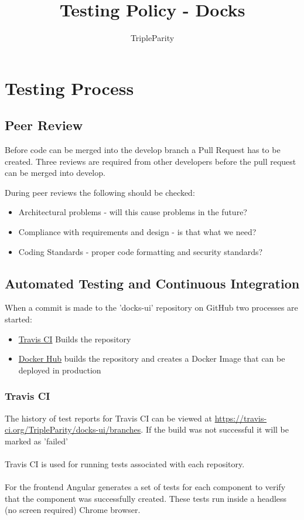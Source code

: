\documentclass[]{article}
\title{Testing Policy - Docks}
\author{TripleParity}
\date{}
\begin{document}
\maketitle

\tableofcontents

\section{Testing Process}

\subsection{Peer Review}
Before code can be merged into the develop branch a Pull Request has to be created.
Three reviews are required from other developers before the pull request
can be merged into develop.

During peer reviews the following should be checked:
\begin{itemize}
	\item Architectural problems - will this cause problems in the future?
	\item Compliance with requirements and design - is that what we need?
	\item Coding Standards - proper code formatting and security standards?
\end{itemize}

\subsection{Automated Testing and Continuous Integration}
When a commit is made to the 'docks-ui' repository on GitHub two
processes are started:
\begin{itemize}
	\item \href{https://travis-ci.org/TripleParity/docks-ui/branches}{Travis CI} Builds the repository
	\item \href{https://hub.docker.com/r/tripleparity/docks-ui/builds/}{Docker Hub} builds the repository and creates a Docker Image that can be deployed in production
\end{itemize}

\subsubsection{Travis CI}
The history of test reports for Travis CI can be viewed at \url{https://travis-ci.org/TripleParity/docks-ui/branches}.
If the build was not successful it will be marked as 'failed' \\
\\
Travis CI is used for running tests associated with each repository. \\
\\
For the frontend Angular generates a set of tests for each component to verify
that the component was successfully created. These tests run inside a
headless (no screen required) Chrome browser.
\end{document}
